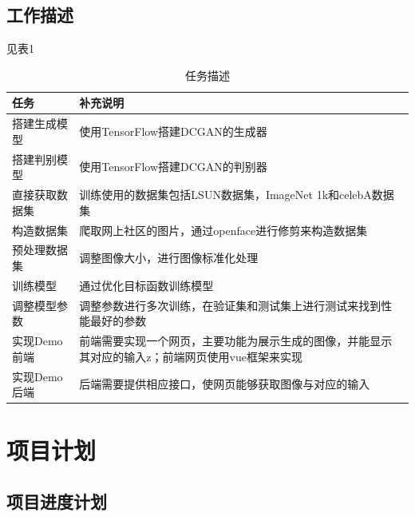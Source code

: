 \documentclass[
  hyperref, a4paper]{ctexart}
\begin{document}
\hypertarget{ux5de5ux4f5cux63cfux8ff0}{%
\subsection{工作描述}\label{ux5de5ux4f5cux63cfux8ff0}}

见表1

\begin{table}
    \caption{任务描述}
    \centering
    \begin{tabular}{|p{5.0cm}<{\centering}|p{7.5cm}<{\centering}|}
    \hline
    任务       & 补充说明                                                 \\ \hline
    搭建生成模型   & 使用TensorFlow搭建DCGAN的生成器                             \\ \hline
    搭建判别模型   & 使用TensorFlow搭建DCGAN的判别器                              \\ \hline
    直接获取数据集  & 训练使用的数据集包括LSUN数据集，ImageNet 1k和celebA数据集             \\ \hline
    构造数据集    & 爬取网上社区的图片，通过openface进行修剪来构造数据集                      \\ \hline
    预处理数据集   & 调整图像大小，进行图像标准化处理                                    \\ \hline
    训练模型     & 通过优化目标函数训练模型                                        \\ \hline
    调整模型参数   & 调整参数进行多次训练，在验证集和测试集上进行测试来找到性能最好的参数                  \\ \hline
    实现Demo前端 & 前端需要实现一个网页，主要功能为展示生成的图像，并能显示其对应的输入z；前端网页使用vue框架来实现   \\ \hline
    实现Demo后端 & 后端需要提供相应接口，使网页能够获取图像与对应的输入                          \\ \hline
    \end{tabular}
\end{table}

\hypertarget{ux9879ux76eeux8ba1ux5212}{%
\section{项目计划}\label{ux9879ux76eeux8ba1ux5212}}

\hypertarget{ux9879ux76eeux8fdbux5ea6ux8ba1ux5212}{%
\subsection{项目进度计划}\label{ux9879ux76eeux8fdbux5ea6ux8ba1ux5212}}
\end{document}
